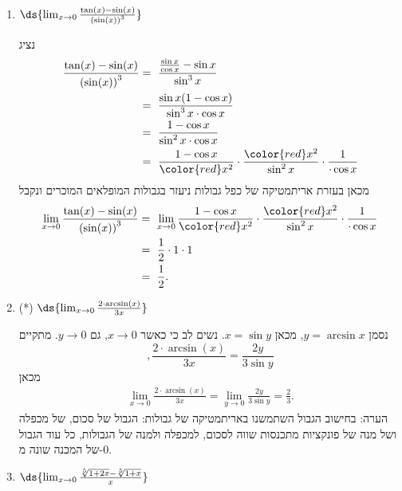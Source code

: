 \begin{enumerate}
\item
$\ds{
\lim_{x\to 0}\frac{\tan(x) - \sin(x)}{\left( \sin(x) \right) ^3}
}$

\ifsol
{}
\begin{solbox}
נציג
\begin{align*}
    \frac{\tan(x) - \sin(x)}{\left( \sin(x) \right) ^3}&=\ \frac{\frac{\sin x}{\cos x}-\sin x}{\sin^3x}\\
    &=\ \frac{\sin x(1-\cos x)}{\sin^3x\cdot\cos x}\\
    &=\ \frac{1-\cos x}{\sin^2x\cdot\cos x}\\
    &=\ \frac{1-\cos x}{\color{red}x^2}\cdot\frac{\color{red}x^2}{\sin^2x}\cdot\frac{1}{\cdot\cos x}
\end{align*}
מכאן
בעזרת אריתמטיקה של כפל גבולות ניעזר בגבולות המופלאים המוכרים ונקבל
\begin{align*}
    \lim_{x\to0}\frac{\tan(x) - \sin(x)}{\left( \sin(x) \right) ^3}&=\ \lim_{x\to0}\frac{1-\cos x}{\color{red}x^2}\cdot\frac{\color{red}x^2}{\sin^2x}\cdot\frac{1}{\cdot\cos x}\\
    &=\ \frac{1}{2}\cdot1\cdot1\\
    &=\ \frac{1}{2}.
\end{align*}
\end{solbox}
\fi

\item (*)
$\ds{
\lim_{x\to 0}\frac{2 \cdot \arcsin(x)}{3x}
}$

\ifsol
{}
\begin{solbox}
נסמן
$y=\arcsin x$,
מכאן
$x=\sin y$.
נשים לב כי כאשר
$x\to 0$,
גם
$y\to 0$.
מתקיים
$$,\frac{2 \cdot \arcsin(x)}{3x}=\frac{2y}{3\sin y}$$
מכאן
\begin{align*}
    \lim_{x\to0}\frac{2 \cdot \arcsin(x)}{3x}= \lim_{y\to0}\frac{2y}{3\sin y}
    = \frac{2}{3}.
\end{align*}
הערה: בחישוב הגבול השתמשנו באריתמטיקה של גבולות: הגבול של סכום, של מכפלה ושל מנה של פונקציות מתכנסות שווה לסכום, למכפלה ולמנה של הגבולות, כל עוד הגבול של המכנה שונה מ-$0$.
\end{solbox}
\fi

\item $\ds{\lim_{x\to0}\frac{\sqrt[5]{1+2x}-\sqrt[5]{1+x}}{x}}$


\end{enumerate}
